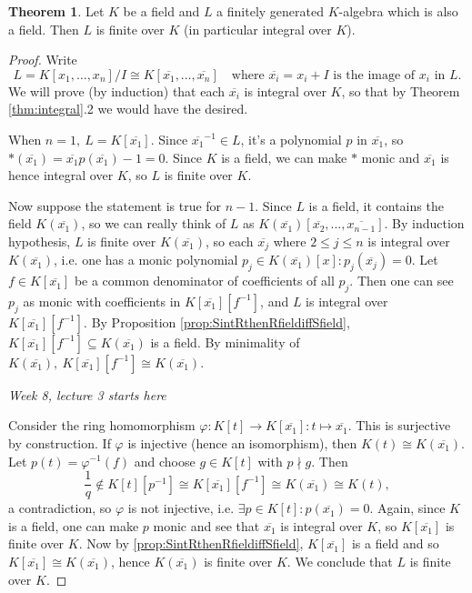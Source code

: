\documentclass[a4paper]{article}
\theoremstyle{definition}
\newtheorem{thm}[defn]{Theorem}
\begin{document}
\begin{thm}
Let $K$ be a field and $L$ a finitely generated $K$-algebra which is also a field. Then $L$ is finite over $K$ (in particular integral over $K$).
\end{thm}
\begin{proof}
Write
\[
L=K[x_1,\ldots,x_n]/I\cong K[\overline{x_1},\ldots,\overline{x_n}]\quad\text{where }\overline{x_i}=x_i+I\text{ is the image of }x_i\text{ in }L.
\]
We will prove (by induction) that each $\overline{x_i}$ is integral over $K$, so that by Theorem \ref{thm:integral}.2 we would have the desired.

When $n=1,\ L=K[\overline{x_1}]$. Since $\overline{x_1}^{-1}\in L$, it's a polynomial $p$ in $\overline{x_1}$, so $\ast(\overline{x_1})=\overline{x_1}p(\overline{x_1})-1=0$. Since $K$ is a field, we can make $\ast$ monic and $\overline{x_1}$ is hence integral over $K$, so $L$ is finite over $K$.

Now suppose the statement is true for $n-1$. Since $L$ is a field, it contains the field $K(\overline{x_1})$, so we can really think of $L$ as $K(\overline{x_1})[\overline{x_2},\ldots,\overline{x_{n-1}}]$. By induction hypothesis, $L$ is finite over $K(\overline{x_1})$, so each $\overline{x_j}$ where $2\leq j\leq n$ is integral over $K(\overline{x_1})$, i.e. one has a monic polynomial $p_j\in K(\overline{x_1})[x]:p_j(\overline{x_j})=0$. Let $f\in K[\overline{x_1}]$ be a common denominator of coefficients of all $p_j$. Then one can see $p_j$ as monic with coefficients in $K[\overline{x_1}][f^{-1}]$, and $L$ is integral over $K[\overline{x_1}][f^{-1}]$. By Proposition \ref{prop:SintRthenRfieldiffSfield}, $K[\overline{x_1}][f^{-1}]\subseteq K(\overline{x_1})$ is a field. By minimality of $K(\overline{x_1}),\ K[\overline{x_1}][f^{-1}]\cong K(\overline{x_1})$.

\begin{flushright}
\textit{Week 8, lecture 3 starts here}
\end{flushright}

Consider the ring homomorphism $\varphi:K[t]\rightarrow K[\overline{x_1}]:t\mapsto \overline{x_1}$. This is surjective by construction. If $\varphi$ is injective (hence an isomorphism), then $K(t)\cong K(\overline{x_1})$. Let $p(t)=\varphi^{-1}(f)$ and choose $g\in K[t]$ with $p\nmid g$. Then
\[
\frac{1}{q}\notin K[t][p^{-1}]\cong K[\overline{x_1}][f^{-1}]\cong K(\overline{x_1})\cong K(t),
\]
a contradiction, so $\varphi$ is not injective, i.e. $\exists p\in K[t]:p(\overline{x_1})=0$. Again, since $K$ is a field, one can make $p$ monic and see that $\overline{x_1}$ is integral over $K$, so $K[\overline{x_1}]$ is finite over $K$. Now by \ref{prop:SintRthenRfieldiffSfield}, $K[\overline{x_1}]$ is a field and so $K[\overline{x_1}]\cong K(\overline{x_1})$, hence $K(\overline{x_1})$ is finite over $K$. We conclude that $L$ is finite over $K$.
\end{proof}
\end{document}
